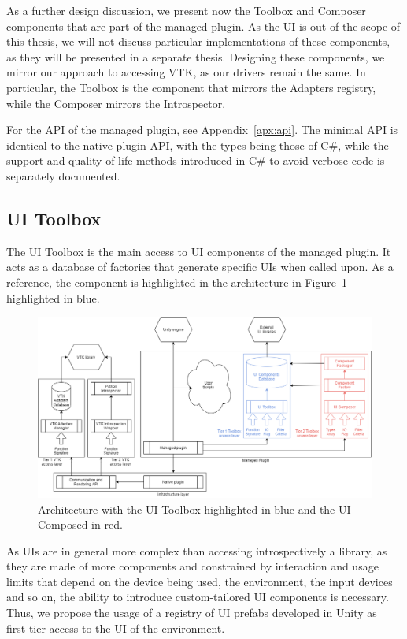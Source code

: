 As a further design discussion, we present now the Toolbox and Composer components that are part of the managed plugin. As the UI is out of the scope of this thesis, we will not discuss particular implementations of these components, as they will be presented in a separate thesis. Designing these components, we mirror our approach to accessing VTK, as our drivers remain the same. In particular, the Toolbox is the component that mirrors the Adapters registry, while the Composer mirrors the Introspector.

For the API of the managed plugin, see Appendix~\ref{apx:api}. The minimal API is identical to the native plugin API, with the types being those of C\#, while the support and quality of life methods introduced in C\# to avoid verbose code is separately documented.

\subsection{UI Toolbox}
\label{sec:design-toolbox}

The UI Toolbox is the main access to UI components of the managed plugin. It acts as a database of factories that generate specific UIs when called upon. As a reference, the component is highlighted in the architecture in Figure~\ref{fig:arch-toolbox-comp} highlighted in blue.

\begin{figure}[!t]
    \centering
    \includegraphics[width=\textwidth]{pictures/Architecture-v0.3-toolbox-comp.png}
    \caption{Architecture with the UI Toolbox highlighted in blue and the UI Composed in red.}
    \label{fig:arch-toolbox-comp}
\end{figure}

As UIs are in general more complex than accessing introspectively a library, as they are made of more components and constrained by interaction and usage limits that depend on the device being used, the environment, the input devices and so on, the ability to introduce custom-tailored UI components is necessary. Thus, we propose the usage of a registry of UI prefabs developed in Unity as first-tier access to the UI of the environment.

